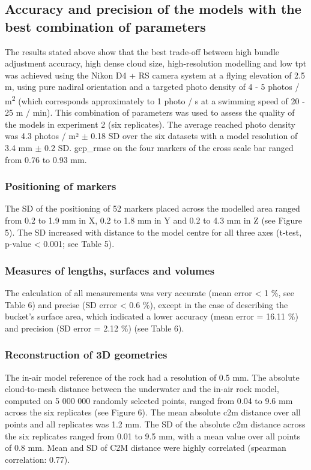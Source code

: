 \subsection{Accuracy and precision of the models with the best combination of parameters}\label{chapitre1_3.2}
The results stated above show that the best trade-off between high bundle adjustment accuracy, high dense cloud size, high-resolution modelling and low \acrshort{tpt} was achieved using the Nikon D4 + RS camera system at a flying elevation of 2.5 m, using pure nadiral orientation and a targeted photo density of 4 - 5 photos / m\textsuperscript{2} (which corresponds approximately to 1 photo / s at a swimming speed of 20 - 25 m / min). This combination of parameters was used to assess the quality of the models in experiment 2 (six replicates). The average reached photo density was 4.3 photos / m² $\pm$ 0.18 SD over the six datasets with a model resolution of 3.4 mm $\pm$ 0.2 SD. \acrshort{gcp_rmse} on the four markers of the cross scale bar ranged from 0.76 to 0.93 mm.

\subsubsection{Positioning of markers}\label{chapitre1_3.2.1}
The SD of the positioning of 52 markers placed across the modelled area ranged from 0.2 to 1.9 mm in X, 0.2 to 1.8 mm in Y and 0.2 to 4.3 mm in Z (see Figure 5). The SD increased with distance to the model centre for all three axes (t-test, p-value < 0.001; see Table 5).

\subsubsection{Measures of lengths, surfaces and volumes}\label{chapitre1_3.2.2}
The calculation of all measurements was very accurate (mean error < 1 \%, see Table 6) and precise (SD error < 0.6 \%), except in the case of describing the bucket’s surface area, which indicated a lower accuracy (mean error = 16.11 \%) and precision (SD error = 2.12 \%) (see Table 6).

\subsubsection{Reconstruction of 3D geometries}\label{chapitre1_3.2.3}
The in-air model reference of the rock had a resolution of 0.5 mm. The absolute cloud-to-mesh distance between the underwater and the in-air rock model, computed on 5 000 000 randomly selected points, ranged from 0.04 to 9.6 mm across the six replicates (see Figure 6). The mean absolute \acrshort{c2m} distance over all points and all replicates was 1.2 mm. The SD of the absolute \acrshort{c2m} distance across the six replicates ranged from 0.01 to 9.5 mm, with a mean value over all points of 0.8 mm. Mean and SD of C2M distance were highly correlated (spearman correlation: 0.77).


